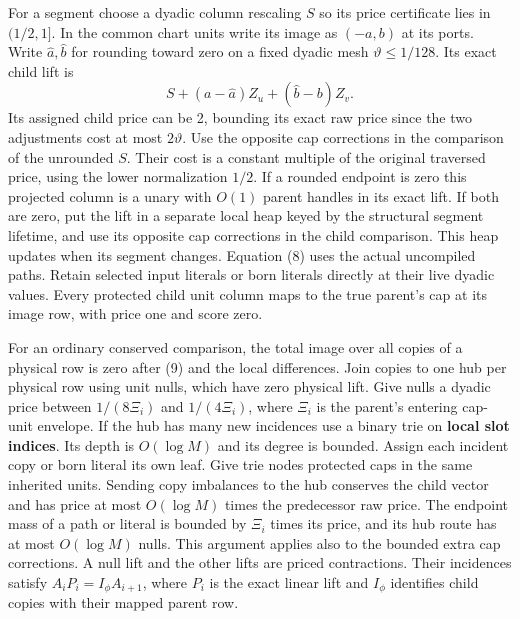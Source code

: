 \documentclass[11pt]{article}
\begin{document}
For a segment choose a dyadic column rescaling \(S\) so its price certificate lies in \((1/2,1]\). In the common chart units write its image as \((-a,b)\) at its ports. Write \(\widehat a,\widehat b\) for rounding toward zero on a fixed dyadic mesh \(\vartheta\le1/128\). Its exact child lift is
\[
   S+(a-\widehat a)Z_u+(\widehat b-b)Z_v .
\tag{9}
\]
Its assigned child price can be 2, bounding its exact raw price since the two adjustments cost at most \(2\vartheta\). Use the opposite cap corrections in the comparison of the unrounded \(S\). Their cost is a constant multiple of the original traversed price, using the lower normalization \(1/2\). If a rounded endpoint is zero this projected column is a unary with \(O(1)\) parent handles in its exact lift. If both are zero, put the lift in a separate local heap keyed by the structural segment lifetime, and use its opposite cap corrections in the child comparison. This heap updates when its segment changes. Equation (8) uses the actual uncompiled paths. Retain selected input literals or born literals directly at their live dyadic values. Every protected child unit column maps to the true parent's cap at its image row, with price one and score zero.

For an ordinary conserved comparison, the total image over all copies of a physical row is zero after (9) and the local differences. Join copies to one hub per physical row using unit nulls, which have zero physical lift. Give nulls a dyadic price between \(1/(8\Xi_i)\) and \(1/(4\Xi_i)\), where \(\Xi_i\) is the parent's entering cap-unit envelope. If the hub has many new incidences use a binary trie on \textbf{local slot indices}. Its depth is \(O(\log M)\) and its degree is bounded. Assign each incident copy or born literal its own leaf. Give trie nodes protected caps in the same inherited units. Sending copy imbalances to the hub conserves the child vector and has price at most \(O(\log M)\) times the predecessor raw price. The endpoint mass of a path or literal is bounded by \(\Xi_i\) times its price, and its hub route has at most \(O(\log M)\) nulls. This argument applies also to the bounded extra cap corrections. A null lift and the other lifts are priced contractions. Their incidences satisfy \(A_i P_i=I_\phi A_{i+1}\), where \(P_i\) is the exact linear lift and \(I_\phi\) identifies child copies with their mapped parent row.
\end{document}
